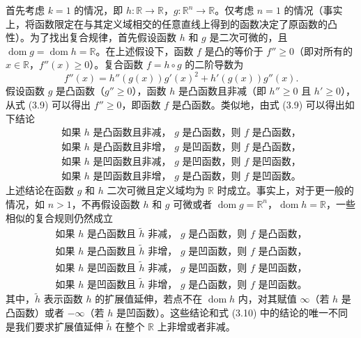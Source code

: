 \documentclass[UTF8,12pt,a4paper,fontset=fandol]{ctexart}
\DeclareMathOperator{\dom}{dom}
\begin{document}
首先考虑 $k=1$ 的情况，即 $h:\mathbb{R}\to\mathbb{R}$，$g:\mathbb{R}^n\to\mathbb{R}$。仅考虑 $n=1$ 的情况（事实上，将函数限定在与其定义域相交的任意直线上得到的函数决定了原函数的凸性）。为了找出复合规律，首先假设函数 $h$ 和 $g$ 是二次可微的，且 $\dom g=\dom h=\mathbb{R}$。在上述假设下，函数 $f$ 是凸的等价于 $f''\geq0$（即对所有的 $x\in\mathbb{R}$，$f''(x)\geq0$）。复合函数 $f=h\circ g$ 的二阶导数为
\begin{equation}
f''(x)=h''(g(x))g'(x)^2+h'(g(x))g''(x).
\tag{3.9}
\end{equation}
假设函数 $g$ 是凸函数（$g''\geq0$），函数 $h$ 是凸函数且非减（即 $h''\geq0$ 且 $h'\geq0$），从式 (3.9) 可以得出 $f''\geq0$，即函数 $f$ 是凸函数。类似地，由式 (3.9) 可以得出如下结论
\begin{equation}
\begin{array}{ll}
\text{如果 }h\text{ 是凸函数且非减， }g\text{ 是凸函数，则 }f\text{ 是凸函数，}\\
\text{如果 }h\text{ 是凸函数且非增， }g\text{ 是凹函数，则 }f\text{ 是凸函数，}\\
\text{如果 }h\text{ 是凹函数且非减， }g\text{ 是凹函数，则 }f\text{ 是凹函数，}\\
\text{如果 }h\text{ 是凹函数且非增， }g\text{ 是凸函数，则 }f\text{ 是凹函数。}
\end{array}
\tag{3.10}
\end{equation}
上述结论在函数 $g$ 和 $h$ 二次可微且定义域均为 $\mathbb{R}$ 时成立。事实上，对于更一般的情况，如 $n>1$，不再假设函数 $h$ 和 $g$ 可微或者 $\dom g=\mathbb{R}^n$，$\dom h=\mathbb{R}$，一些相似的复合规则仍然成立
\begin{equation}
\begin{array}{ll}
\text{如果 }h\text{ 是凸函数且 }\tilde h\text{ 非减， }g\text{ 是凸函数，则 }f\text{ 是凸函数，}\\
\text{如果 }h\text{ 是凸函数且 }\tilde h\text{ 非增， }g\text{ 是凹函数，则 }f\text{ 是凸函数，}\\
\text{如果 }h\text{ 是凹函数且 }\tilde h\text{ 非减， }g\text{ 是凹函数，则 }f\text{ 是凹函数，}\\
\text{如果 }h\text{ 是凹函数且 }\tilde h\text{ 非增， }g\text{ 是凸函数，则 }f\text{ 是凹函数。}
\end{array}
\tag{3.11}
\end{equation}
其中，$\tilde h$ 表示函数 $h$ 的扩展值延伸，若点不在 $\dom h$ 内，对其赋值 $\infty$（若 $h$ 是凸函数）或者 $-\infty$（若 $h$ 是凹函数）。这些结论和式 (3.10) 中的结论的唯一不同是我们要求扩展值延伸 $\tilde h$ 在整个 $\mathbb{R}$ 上非增或者非减。
\end{document}
